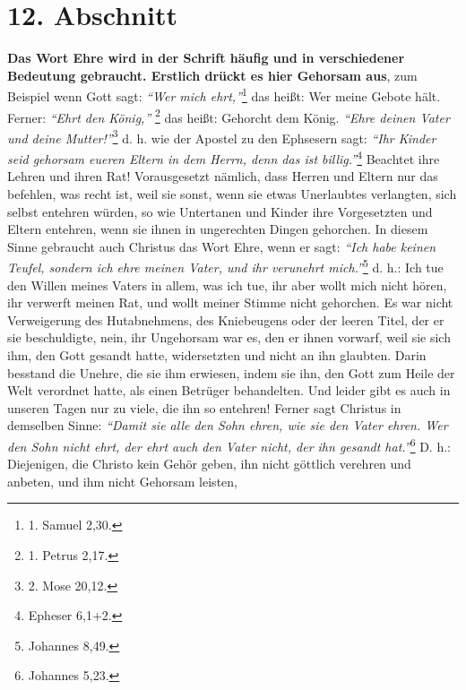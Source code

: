 \section{12. Abschnitt} \label{kap9_ab12}

\label{ref:09_12_ehre} \textbf{Das Wort Ehre
wird in der Schrift
häufig und in verschiedener Bedeutung
gebraucht. Erstlich drückt es hier Gehorsam aus}, zum Beispiel wenn
Gott sagt:
\textit{"`Wer mich ehrt,"'}\footnote{1. Samuel 2,30.}
das heißt: Wer meine Gebote hält. Ferner:
\textit{"`Ehrt den König,"'}
\footnote{1. Petrus 2,17.}
das heißt: Gehorcht dem König.
\textit{"`Ehre deinen Vater und deine Mutter!"'}\footnote{2. Mose 20,12.}
d. h. wie der
Apostel zu den Ephsesern sagt:
\textit{"`Ihr Kinder seid gehorsam eueren Eltern in dem
Herrn, denn das ist billig."'}\footnote{Epheser 6,1+2.}
Beachtet ihre Lehren und
ihren Rat! Vorausgesetzt nämlich, dass Herren und Eltern nur das befehlen, was
recht ist, weil sie sonst, wenn sie etwas Unerlaubtes verlangten, sich selbst
entehren würden, so wie Untertanen und Kinder ihre Vorgesetzten und Eltern
entehren, wenn sie ihnen in ungerechten Dingen gehorchen. In diesem Sinne
gebraucht auch Christus das Wort Ehre, wenn er sagt:
\textit{"`Ich habe keinen Teufel,
sondern ich ehre meinen Vater, und ihr verunehrt mich."'}\footnote{Johannes
8,49.}
d. h.: Ich tue den Willen meines Vaters in allem, was ich tue, ihr aber wollt
mich nicht hören, ihr verwerft meinen Rat, und wollt meiner Stimme nicht
gehorchen. Es war nicht Verweigerung des Hutabnehmens, des Kniebeugens oder der
leeren Titel, der er sie beschuldigte, nein, ihr Ungehorsam war es, den er ihnen
vorwarf, weil sie sich ihm, den Gott gesandt hatte, widersetzten und nicht an
ihn glaubten. Darin besstand die Unehre, die sie ihm erwiesen, indem sie ihn,
den Gott zum Heile der Welt verordnet hatte, als einen Betrüger behandelten. Und
leider gibt es auch in unseren Tagen nur zu viele, die ihn so entehren! Ferner
sagt Christus in demselben Sinne:
\textit{"`Damit sie alle den Sohn ehren, wie sie den
Vater ehren. Wer den Sohn nicht ehrt, der ehrt auch den Vater nicht, der ihn
gesandt hat."'}\footnote{Johannes 5,23.}
D. h.: Diejenigen, die Christo kein Gehör
geben, ihn nicht göttlich verehren und anbeten, und ihm nicht Gehorsam leisten,
